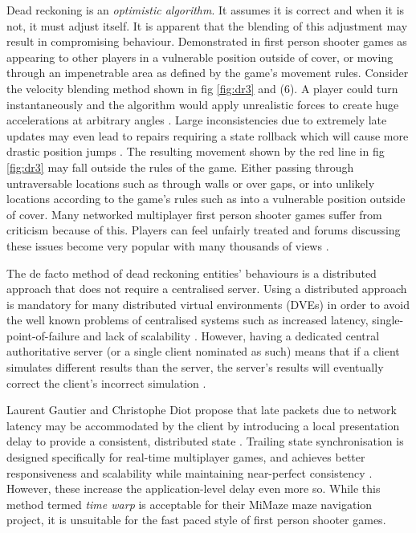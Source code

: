\documentclass[journal]{IEEEtran}
\begin{document}
Dead reckoning is an \textit{optimistic algorithm}. It assumes it is correct  and when it is not, it must adjust itself. It is apparent that the blending of this adjustment may result in compromising behaviour. Demonstrated in first person shooter games as appearing to other players in a vulnerable position outside of cover, or moving through an impenetrable area as defined by the game's movement rules. Consider the velocity blending method shown in fig \ref{fig:dr3} and (6). A player could turn instantaneously and the algorithm would apply unrealistic forces to create huge accelerations at arbitrary angles \cite{bernier2001latency}. Large inconsistencies due to extremely late updates may even lead to repairs requiring a state rollback which will cause more drastic position jumps \cite{cronin2002efficient}. The resulting movement shown by the red line in fig \ref{fig:dr3} may fall outside the rules of the game. Either passing through untraversable locations such as through walls or over gaps, or into unlikely locations according to the game's rules such as into a vulnerable position outside of cover. Many networked multiplayer first person shooter games suffer from criticism because of this. Players can feel unfairly treated and forums discussing these issues become very popular with many thousands of views \cite{rout2013youtube} \cite{gkac2014gamefaqs} \cite{drift0r2013youtube} \cite{solaire2016reddit} \cite{ss2018reddit} \cite{hp2015bungie}.

The de facto method of dead reckoning entities' behaviours is a distributed approach that does not require a centralised server. Using a distributed approach is mandatory for many distributed virtual environments (DVEs) in order to avoid the well known problems of centralised systems such as increased latency, single-point-of-failure and lack of scalability \cite{mauve2000keep}. However, having a dedicated central authoritative server (or a single client nominated as such) means that if a client simulates different results than the server, the server’s results will eventually correct the client’s incorrect simulation \cite{bernier2001latency}.

Laurent Gautier and Christophe Diot propose that late packets due to network latency may be accommodated by the client by introducing a local presentation delay to provide a consistent, distributed state \cite{gautier1998design}. Trailing state synchronisation is designed specifically for real-time multiplayer games, and achieves better responsiveness and scalability while maintaining near-perfect consistency \cite{cronin2001distributed}. However, these increase the application-level delay even more so. While this method termed \textit{time warp} is acceptable for their MiMaze maze navigation project, it is unsuitable for the fast paced style of first person shooter games.
\end{document}

